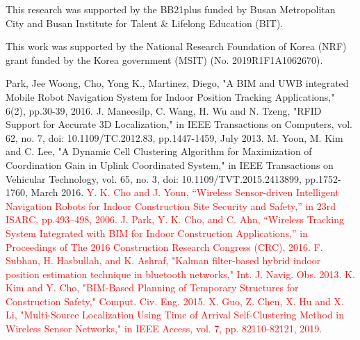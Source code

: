 \documentclass[conference]{IEEEtran}
\begin{document}
This research was supported by the BB21plus funded by Busan Metropolitan City and Busan Institute for Talent \& Lifelong Education (BIT).

This work was supported by the National Research Foundation of Korea (NRF) grant funded by the Korea government (MSIT) (No. 2019R1F1A1062670).

\begin{thebibliography}{00}
     Park, Jee Woong, Cho, Yong K., Martinez, Diego, "A BIM and UWB integrated Mobile Robot Navigation System for Indoor Position Tracking Applications," 6(2), pp.30-39, 2016.
     J. Maneesilp, C. Wang, H. Wu and N. Tzeng, "RFID Support for Accurate 3D Localization," in IEEE Transactions on Computers, vol. 62, no. 7, doi: 10.1109/TC.2012.83, pp.1447-1459, July 2013.
     M. Yoon, M. Kim and C. Lee, "A Dynamic Cell Clustering Algorithm for Maximization of Coordination Gain in Uplink Coordinated System," in IEEE Transactions on Vehicular Technology, vol. 65, no. 3, doi: 10.1109/TVT.2015.2413899, pp.1752-1760, March 2016.
    \textcolor{red}{
         Y. K. Cho and J. Youn, “Wireless Sensor-driven Intelligent Navigation Robots for Indoor Construction Site Security and Safety,” in 23rd ISARC, pp.493–498, 2006.
         J. Park, Y. K. Cho, and C. Ahn, “Wireless Tracking System Integrated with BIM for Indoor Construction Applications,” in Proceedings of The 2016 Construction Research Congress (CRC), 2016.
         F. Subhan, H. Hasbullah, and K. Ashraf, "Kalman filter-based hybrid indoor position estimation technique in bluetooth networks," Int. J. Navig. Obs. 2013.
         K. Kim and Y. Cho, "BIM-Based Planning of Temporary Structures for Construction Safety," Comput. Civ. Eng. 2015.
         X. Guo, Z. Chen, X. Hu and X. Li, "Multi-Source Localization Using Time of Arrival Self-Clustering Method in Wireless Sensor Networks," in IEEE Access, vol. 7, pp. 82110-82121, 2019.
    }
\end{thebibliography}
\end{document}
